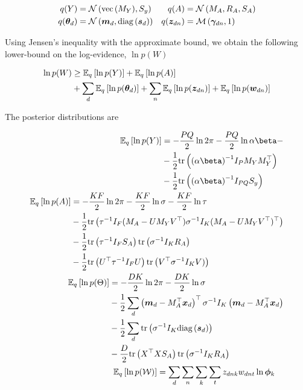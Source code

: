 \begin{equation}
\begin{split}
q(Y) &= \nor{\vecf{M_Y}}{S_y} &
q(A) &= \mnor{M_A}{R_A}{S_A} \\
q(\thd) &= \nor{\md}{\diag{\vv{s}_d}} &
q(\zdn) & = \muln{\gdn}{1} \\
\end{split}
\end{equation}


Using Jensen's inequality with the approximate bound, we obtain the following lower-bound on the log-evidence, $\ln p(W)$

\begin{equation}
\begin{split}
\ln p(W) 
&\geq \ex{\ln p(Y)}{q} + \ex{\ln p(A)}{q} \\
&+ \sum_d \ex{\ln p(\thd)}{q} + \sum_n \ex{\ln p(\zdn)}{q} + \ex{\ln p(\wdn)}{q}
\end{split}
\end{equation}

The posterior distributions are

\begin{align}
\begin{split}
\ex{\ln p(Y)}{q} 
    & = -\halve{PQ} \ln 2\pi - \halve{PQ} \ln \alpha \beta - \\
    & - \half \Tr{ \invb{\alpha \beta} I_P M_Y M_Y\T } \\
    & - \half \Tr{\invb{\alpha \beta} I_{PQ} S_y }
\end{split} \\
\begin{split}
\ex{\ln p(A)}{q} 
    & = -\halve{KF} \ln 2\pi - \halve{KF} \ln \sigma - \halve{KF} \ln \tau \\
    & - \half \Tr{ \inv{\tau} I_F (M_A - U M_Y V\T) \inv{\sigma} I_K (M_A - U M_Y V\T)\T } \\
    & - \half \Tr{ \inv{\tau} I_F S_A}\Tr{\inv{\sigma} I_K R_A} \\
    & - \half \Tr{ U\T \inv{\tau}I_F U}\Tr{ V\T \inv{\sigma} I_K V)}
\end{split} \\
\begin{split}
\ex{\ln p(\Theta)}{q} 
    & = -\halve{DK} \ln 2\pi - \halve{DK} \ln \sigma  \\
    & - \half \sum_d \left(\md - M_A\T \xd\right)\T \inv{\sigma} I_K \left(\md - M_A\T \xd\right) \\
    & - \half \sum_d \Tr{ \inv{\sigma} I_K \diag{\vv{s}_d}} \\
    & - \halve{D} \Tr{ X\T X S_A}\Tr{\inv{\sigma} I_K R_A}
\end{split}\\
\begin{split}
\ex{\ln p(\mathcal{W})}{q} 
    & = \sum_d \sum_n \sum_k \sum_t \zdnk \wdnt \ln \pk
\end{split}
\end{align}

